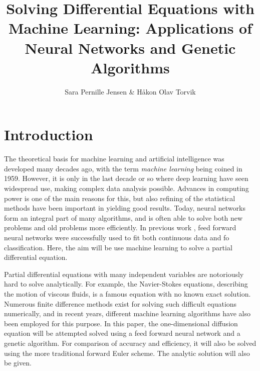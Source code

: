 \documentclass[multicolumn, 9pt]{extarticle}
\author{\Large Sara Pernille Jensen \& Håkon Olav Torvik}
\title{\Huge Solving Differential Equations with Machine Learning: Applications of Neural Networks and Genetic Algorithms }
\affiliation{\large FYS-STK4155 – Applied Data Analysis and Machine Learning
\\Autumn 2021\\Department of Physics\\University of Oslo\\\\\today}
\begin{document}



\maketitle

\pagestyle{myplain}


\twocolumn
\section{Introduction}

The theoretical basis for machine learning and artificial intelligence was developed many decades ago, with the term \textit{machine learning} being coined in 1959. However, it is only in the last decade or so where deep learning have seen widespread use, making complex data analysis possible. Advances in computing power is one of the main reasons for this, but also refining of the statistical methods have been important in yielding good results. Today, neural networks form an integral part of many algorithms, and is often able to solve both new problems and old problems more efficiently. In previous work \cite{p2S} \cite{p2HO}, feed forward neural networks were successfully used to fit both continuous data and fo classification. Here, the aim will be use machine learning to solve a partial differential equation.

Partial differential equations with many independent variables are notoriously hard to solve analytically. For example, the Navier-Stokes equations, describing the motion of viscous fluids, is a famous equation with no known exact solution. Numerous finite difference methods exist for solving such difficult equations numerically, and in recent years, different machine learning algorithms have also been employed for this purpose. In this paper, the one-dimensional diffusion equation will be attempted solved using a feed forward neural network and a genetic algorithm. For comparison of accuracy and efficiency, it will also be solved using the more traditional forward Euler scheme. The analytic solution will also be given.
\end{document}

